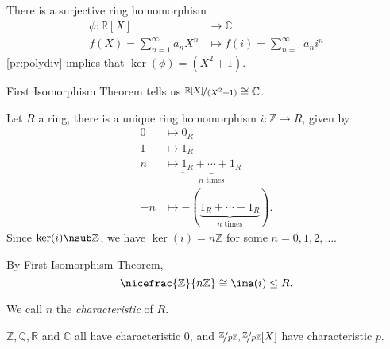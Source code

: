 \begin{example}
    There is a surjective ring homomorphism
    \[
    \begin{aligned}
      \phi
      \colon \mathbb{R}[X] & \longrightarrow   \mathbb{C} \\
      f(X) = \sum\limits_{n=1}^{\infty} a_n X^n & \longmapsto f(i) = \sum\limits_{n=1}^{\infty} a_n i^n
    \end{aligned}
    \]
    \cref{pr:polydiv} implies that \(\ker(\phi) = (X^2 + 1)\).

    First Isomorphism Theorem tells us \(\nicefrac{\mathbb{R}[X]}{(X^{2}+1)}\cong \mathbb{C}\).
\end{example}
\begin{example}
    Let \(R\) a ring, there is a unique ring homomorphism \(i: \mathbb{Z} \to R\), given by
    \begin{align*}
        0 &\longmapsto 0_R\\
        1 &\longmapsto 1_R\\
        n &\longmapsto \underbrace{1_R + \cdots + 1_R}_{n \text{ times}}\\
        -n &\longmapsto -(\underbrace{1_R + \cdots + 1_R}_{n \text{ times}}).
    \end{align*}
    Since \(\ker(i) \nsub \mathbb{Z}\), we have \(\ker(i) = n\mathbb{Z}\) for some \(n = 0,1,2, \ldots\).

    By First Isomorphism Theorem,
    \[
        \nicefrac{\mathbb{Z}}{n\mathbb{Z}}\cong \ima(i) \leq R.
    \]
\end{example}
\begin{definition}{}{}
    We call \(n\)  the \textit{characteristic} of \(R\).
\end{definition}
\begin{example}
    \(\mathbb{Z},\mathbb{Q},\mathbb{R}\) and \(\mathbb{C}\) all have characteristic 0, and \(\nicefrac{\mathbb{Z}}{p\mathbb{Z}}, \nicefrac{\mathbb{Z}}{p\mathbb{Z}}[X]\) have characteristic \(p\).
\end{example}
